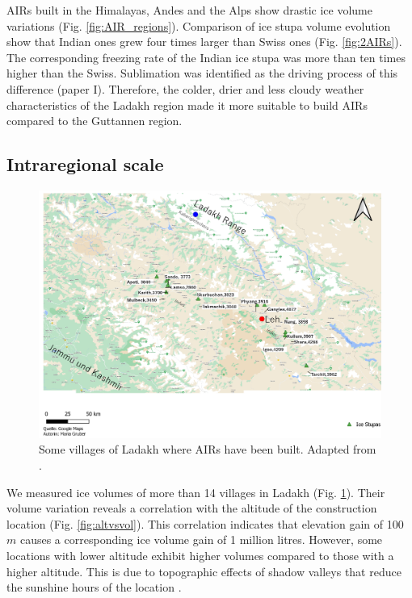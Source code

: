 AIRs built in the Himalayas, Andes and the Alps show drastic ice volume variations (Fig. \ref{fig:AIR_regions}).
Comparison of ice stupa volume evolution show that Indian ones grew four times larger than Swiss ones (Fig.
\ref{fig:2AIRs}). The corresponding freezing rate of the Indian ice stupa was more than ten times higher than
the Swiss. Sublimation was identified as the driving process of this difference (paper I). Therefore, the
colder, drier and less cloudy weather characteristics of the Ladakh region made it more suitable to build AIRs
compared to the Guttannen region. 

\subsection{Intraregional scale}

\begin{figure}[htb]
	\includegraphics[width=\textwidth]{figs/ISC_villages}
  \caption{Some villages of Ladakh where AIRs have been built. Adapted from \citet{mariagruberIceStupasLadakh2022}.}
	\label{fig:villages}
\end{figure}

We measured ice volumes of more than 14 villages in Ladakh (Fig. \ref{fig:villages}). Their volume variation
reveals a correlation with the altitude of the construction location (Fig. \ref{fig:altvsvol}). This correlation
indicates that elevation gain of 100 $m$ causes a corresponding ice volume gain of 1 million litres. However,
some locations with lower altitude exhibit higher volumes compared to those with a higher altitude. This is due
to topographic effects of shadow valleys that reduce the sunshine hours of the location
\citep{mariagruberIceStupasLadakh2022}.

